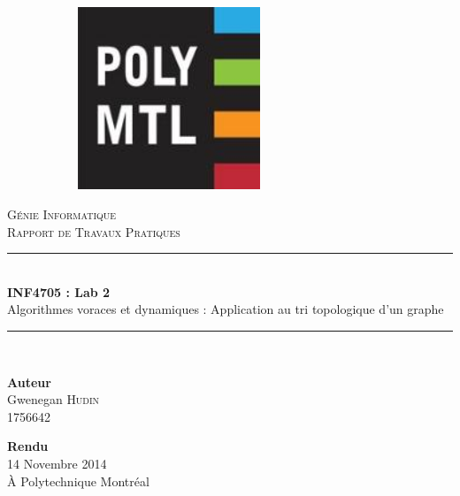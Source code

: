 \documentclass[10pt,a4paper]{article}
\newcommand{\HRule}{\rule{\linewidth}{0.5mm}}
\begin{document}
\begin{titlepage}
	\begin{center}
		\begin{figure}
        \begin{subfigure}[c]{0.2\textwidth}
        		\centering
                \includegraphics[width=0.6\textwidth]{images/logo-polymtl}
        \end{subfigure}
		\end{figure}
		
		
		\vspace{30pt}
		\textsc{\huge Génie Informatique}\\
		\textsc{\LARGE Rapport de Travaux Pratiques}\\		
		\vfill
		
		\HRule \\[0.7cm]
		{\Huge \bfseries INF4705 : Lab 2}\\[0.4cm]
		{\Large Algorithmes voraces et dynamiques : Application au tri topologique d'un graphe}\\[0.2cm]
		\HRule\\[1cm]
		
		\vfill
		
		\begin{minipage}{0.49\textwidth}
			\begin{flushleft} \LARGE
				\textbf{Auteur}\\
				Gwenegan \textsc{Hudin}\\ 1756642\\[0.5cm]
			\end{flushleft}
		\end{minipage}
		\begin{minipage}{0.49\textwidth}
			\begin{flushright} \LARGE
				\textbf{Rendu}\\
				14 Novembre 2014\\ À Polytechnique Montréal\\[0.5cm]
			\end{flushright}
		\end{minipage}
	\end{center}
\end{titlepage}
\end{document}
